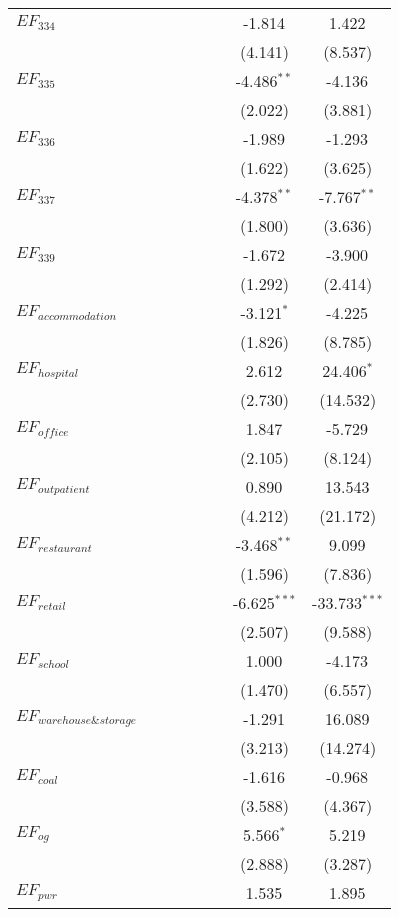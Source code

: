 \begin{longtable}[h]{lccccccc}
 $EF_{334}$ & & & & & & -1.814$^{}$ & 1.422$^{}$ \\
  & & & & & & (4.141) & (8.537) \\
$EF_{335}$ & & & & & & -4.486$^{**}$ & -4.136$^{}$ \\
  & & & & & & (2.022) & (3.881) \\
$EF_{336}$ & & & & & & -1.989$^{}$ & -1.293$^{}$ \\
  & & & & & & (1.622) & (3.625) \\
$EF_{337}$ & & & & & & -4.378$^{**}$ & -7.767$^{**}$ \\
  & & & & & & (1.800) & (3.636) \\
$EF_{339}$ & & & & & & -1.672$^{}$ & -3.900$^{}$ \\
  & & & & & & (1.292) & (2.414) \\
$EF_{accommodation}$ & & & & & & -3.121$^{*}$ & -4.225$^{}$ \\
  & & & & & & (1.826) & (8.785) \\
$EF_{hospital}$ & & & & & & 2.612$^{}$ & 24.406$^{*}$ \\
  & & & & & & (2.730) & (14.532) \\
$EF_{office}$ & & & & & & 1.847$^{}$ & -5.729$^{}$ \\
  & & & & & & (2.105) & (8.124) \\
$EF_{outpatient}$ & & & & & & 0.890$^{}$ & 13.543$^{}$ \\
  & & & & & & (4.212) & (21.172) \\
$EF_{restaurant}$ & & & & & & -3.468$^{**}$ & 9.099$^{}$ \\
  & & & & & & (1.596) & (7.836) \\
$EF_{retail}$ & & & & & & -6.625$^{***}$ & -33.733$^{***}$ \\
  & & & & & & (2.507) & (9.588) \\
$EF_{school}$ & & & & & & 1.000$^{}$ & -4.173$^{}$ \\
  & & & & & & (1.470) & (6.557) \\
$EF_{warehouse\&storage}$ & & & & & & -1.291$^{}$ & 16.089$^{}$ \\
  & & & & & & (3.213) & (14.274) \\
$EF_{coal}$ & & & & & & -1.616$^{}$ & -0.968$^{}$ \\
  & & & & & & (3.588) & (4.367) \\
$EF_{og}$ & & & & & & 5.566$^{*}$ & 5.219$^{}$ \\
  & & & & & & (2.888) & (3.287) \\
$EF_{pwr}$ & & & & & & 1.535$^{}$ & 1.895$^{}$ \\

\end{longtable}
